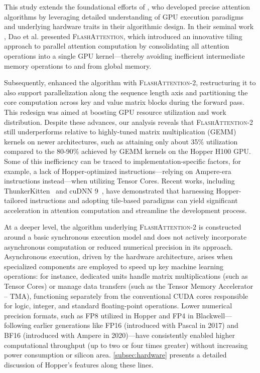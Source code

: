 This study extends the foundational efforts of \citet{dao2022flashattention}, who developed precise attention algorithms by leveraging detailed understanding of GPU execution paradigms and underlying hardware traits in their algorithmic design. In their seminal work \citep{dao2022flashattention}, Dao et al. presented \textsc{FlashAttention}, which introduced an innovative tiling approach to parallel attention computation by consolidating all attention operations into a single GPU kernel—thereby avoiding inefficient intermediate memory operations to and from global memory.

Subsequently, \citet{dao2023flashattention2} enhanced the algorithm with \textsc{FlashAttention-2}, restructuring it to also support parallelization along the sequence length axis and partitioning the core computation across key and value matrix blocks during the forward pass. This redesign was aimed at boosting GPU resource utilization and work distribution. Despite these advances, our analysis reveals that \textsc{FlashAttention-2} still underperforms relative to highly-tuned matrix multiplication (GEMM) kernels on newer architectures, such as attaining only about 35\% utilization compared to the 80-90\% achieved by GEMM kernels on the Hopper H100 GPU. Some of this inefficiency can be traced to implementation-specific factors, for example, a lack of Hopper-optimized instructions—relying on Ampere-era instructions instead—when utilizing Tensor Cores. Recent works, including ThunkerKitten~\citep{spector2024thunder} and cuDNN 9~\citep{cudnn9}, have demonstrated that harnessing Hopper-tailored instructions and adopting tile-based paradigms can yield significant acceleration in attention computation and streamline the development process.

At a deeper level, the algorithm underlying \textsc{FlashAttention-2} is constructed around a basic synchronous execution model and does not actively incorporate asynchronous computation or reduced numerical precision in its approach. Asynchronous execution, driven by the hardware architecture, arises when specialized components are employed to speed up key machine learning operations: for instance, dedicated units handle matrix multiplications (such as Tensor Cores) or manage data transfers (such as the Tensor Memory Accelerator -- TMA), functioning separately from the conventional CUDA cores responsible for logic, integer, and standard floating-point operations. Lower numerical precision formats, such as FP8 utilized in Hopper and FP4 in Blackwell—following earlier generations like FP16 (introduced with Pascal in 2017) and BF16 (introduced with Ampere in 2020)—have consistently enabled higher computational throughput (up to two or four times greater) without increasing power consumption or silicon area. \cref{subsec:hardware} presents a detailed discussion of Hopper’s features along these lines.

